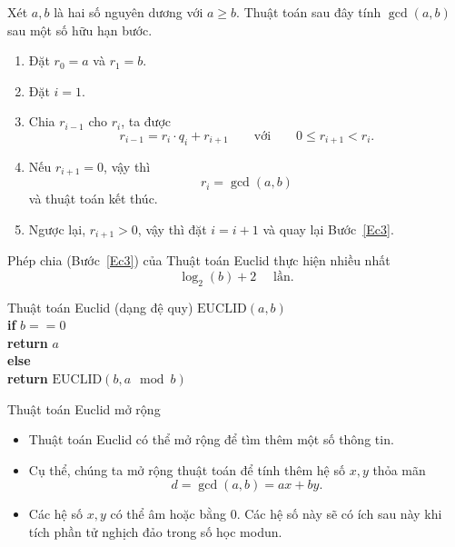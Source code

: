 \begin{frame}
  \begin{thrm} Xét $a,b$ là hai số nguyên dương với $a\geq b$. Thuật toán sau đây tính $\gcd(a,b)$ sau một số hữu hạn bước.
    \begin{enumerate}
    \item Đặt $r_0 = a$ và $r_1 = b$.
    \item Đặt $i = 1$.
    \item\label{Ec3} Chia $r_{i-1}$ cho $r_i$, ta được 
      $$
      r_{i-1} = r_i \cdot q_i + r_{i+1} \qquad \text{với} \qquad 0\leq r_{i+1} < r_i. 
      $$
    \item Nếu $r_{i+1} = 0$, vậy thì 
      $$
      r_i = \gcd(a,b)
      $$
      và thuật toán kết thúc.
    \item Ngược lại, $r_{i+1} > 0$, vậy thì đặt $i=i+1$ và quay lại Bước~\ref{Ec3}.  
    \end{enumerate}
    
  \end{thrm}
\end{frame}

\begin{frame}
  \begin{thrm}
     Phép chia (Bước~\ref{Ec3}) của  Thuật toán Euclid thực hiện nhiều nhất 
    $$
    \log_2(b) + 2\quad  \text{ lần}.
    $$  
  \end{thrm}
\end{frame}

\begin{frame}
  \begin{block}{Thuật toán Euclid (dạng đệ quy)}
    \qquad $\text{EUCLID} (a,b)$ \\
    \qquad \qquad \textbf{if} $b == 0$ \\
    \qquad \qquad \qquad \textbf{return } $a$\\
    \qquad \qquad \textbf{else} \\
    \qquad \qquad \qquad \textbf{return}  $\text{EUCLID} (b,a \mod b)$ 
  \end{block}
\end{frame}

\begin{frame}{Thuật toán Euclid mở rộng}
  \begin{itemize}
  \item Thuật toán Euclid có thể mở rộng để tìm thêm một số thông tin.
  \item Cụ thể, chúng ta mở rộng thuật toán để tính thêm hệ số $x,y$ thỏa mãn 
    $$
    d = \gcd (a,b) = ax + by. 
    $$
  \item Các hệ số $x,y$ có thể âm hoặc bằng $0$. Các hệ số này sẽ có ích sau này khi tích phần tử nghịch đảo trong số học modun.
  \end{itemize}
\end{frame}

